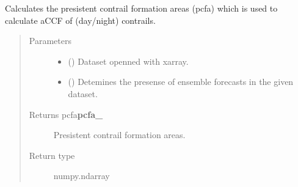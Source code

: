 \documentclass[a4paper,11pt,english]{sphinxmanual}
\begin{document}

\begin{fulllineitems}
\label{\detokenize{envlib:envlib.contrail.get_pcfa}}
Calculates the presistent contrail formation areas (pcfa) which is used to calculate aCCF of (day/night) contrails.
\begin{quote}\begin{description}
\item[{Parameters}] \leavevmode\begin{itemize}
\item {} 
 () \textendash{} Dataset openned with xarray.

\item {} 
 () \textendash{} Detemines the presense of ensemble forecasts in the given dataset.

\end{itemize}

\item[{Returns pcfa{\color{red}\bfseries{}pcfa\_}}] \leavevmode
Presistent contrail formation areas.

\item[{Return type}] \leavevmode
numpy.ndarray

\end{description}\end{quote}

\end{fulllineitems}

\end{document}
